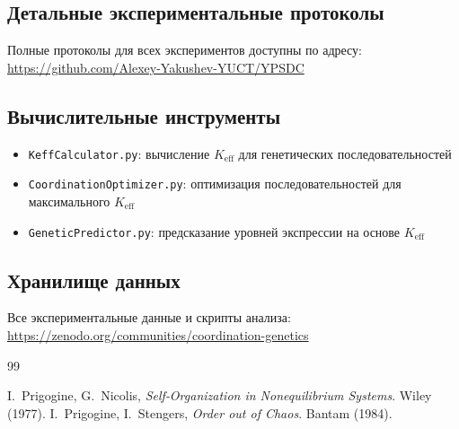 \documentclass[12pt]{article}
\begin{document}
	\subsection{Детальные экспериментальные протоколы}
	
	Полные протоколы для всех экспериментов доступны по адресу:\\
	\url{https://github.com/Alexey-Yakushev-YUCT/YPSDC}
	
	\subsection{Вычислительные инструменты}
	
	\begin{itemize}
		\item \texttt{KeffCalculator.py}: вычисление $K_{\text{eff}}$ для генетических последовательностей
		\item \texttt{CoordinationOptimizer.py}: оптимизация последовательностей для максимального $K_{\text{eff}}$
		\item \texttt{GeneticPredictor.py}: предсказание уровней экспрессии на основе $K_{\text{eff}}$
	\end{itemize}
	
	\subsection{Хранилище данных}
	
	Все экспериментальные данные и скрипты анализа:\\
	\url{https://zenodo.org/communities/coordination-genetics}
	
	\begin{thebibliography}{99}
		
		 I.~Prigogine, G.~Nicolis, \emph{Self‑Organization in Nonequilibrium Systems}. Wiley (1977).
		 I.~Prigogine, I.~Stengers, \emph{Order out of Chaos}. Bantam (1984).
		
	\end{thebibliography}
	
\end{document}
